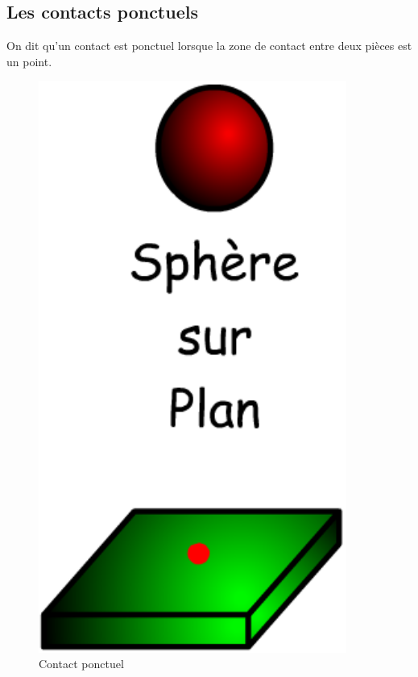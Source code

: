 \documentclass[10pt,fleqn,draft]{article} %
\begin{document}
  \subsection{Les contacts ponctuels}
  \begin{defi}
    On dit qu'un contact est ponctuel lorsque la zone de contact entre deux pièces est un point.
  \end{defi}
\begin{figure}[h]
  \centering
  \includegraphics[width=0.9\textwidth,height=.2\textheight,keepaspectratio]{images/ponctuel}
  \caption{Contact ponctuel}
  \label{fig:ponctuel}
\end{figure}
\pagebreak
\end{document}
